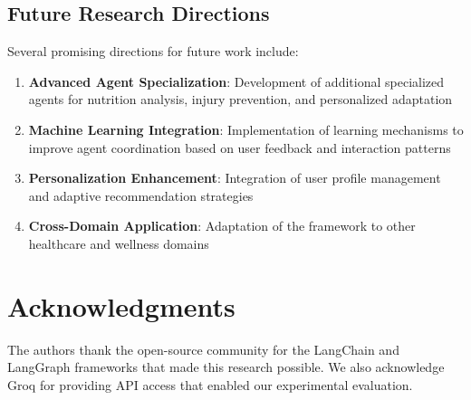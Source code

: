 \documentclass[conference]{IEEEtran}
\begin{document}
\subsection{Future Research Directions}

Several promising directions for future work include:

\begin{enumerate}
\item \textbf{Advanced Agent Specialization}: Development of additional specialized agents for nutrition analysis, injury prevention, and personalized adaptation
\item \textbf{Machine Learning Integration}: Implementation of learning mechanisms to improve agent coordination based on user feedback and interaction patterns
\item \textbf{Personalization Enhancement}: Integration of user profile management and adaptive recommendation strategies
\item \textbf{Cross-Domain Application}: Adaptation of the framework to other healthcare and wellness domains
\end{enumerate}

\section{Acknowledgments}

The authors thank the open-source community for the LangChain and LangGraph frameworks that made this research possible. We also acknowledge Groq for providing API access that enabled our experimental evaluation.
\end{document}
